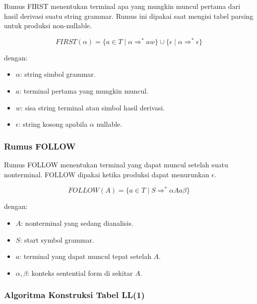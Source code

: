 \begin{jawab}
Rumus FIRST menentukan terminal apa yang mungkin muncul pertama dari hasil derivasi suatu string grammar. Rumus ini dipakai saat mengisi tabel parsing untuk produksi non-nullable.
\end{jawab}

\begin{equation}
    FIRST(\alpha)=\{a\in T \mid \alpha\Rightarrow^* aw\}\cup\{\epsilon\mid \alpha\Rightarrow^*\epsilon\}
    \label{eq:first-ll1}
\end{equation}

dengan:
\begin{itemize}
    \item $\alpha$: string simbol grammar.
    \item $a$: terminal pertama yang mungkin muncul.
    \item $w$: sisa string terminal atau simbol hasil derivasi.
    \item $\epsilon$: string kosong apabila $\alpha$ nullable.
\end{itemize}

\subsubsection{Rumus FOLLOW}

\begin{jawab}
Rumus FOLLOW menentukan terminal yang dapat muncul setelah suatu nonterminal. FOLLOW dipakai ketika produksi dapat menurunkan $\epsilon$.
\end{jawab}

\begin{equation}
    FOLLOW(A)=\{a\in T \mid S\Rightarrow^* \alpha Aa\beta\}
    \label{eq:follow-ll1}
\end{equation}

dengan:
\begin{itemize}
    \item $A$: nonterminal yang sedang dianalisis.
    \item $S$: start symbol grammar.
    \item $a$: terminal yang dapat muncul tepat setelah $A$.
    \item $\alpha,\beta$: konteks sentential form di sekitar $A$.
\end{itemize}

\subsubsection{Algoritma Konstruksi Tabel LL(1)}

